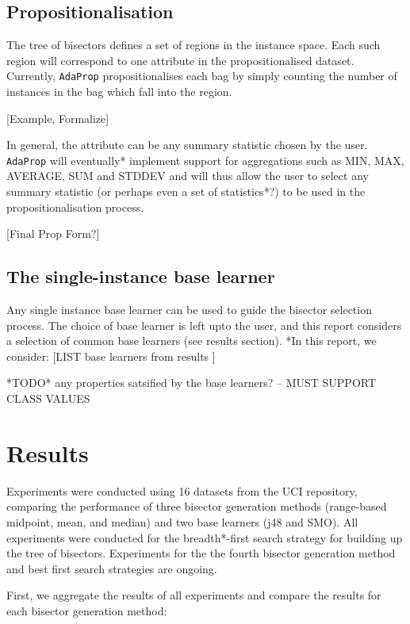 \documentclass[a4paper,12pt]{article} %
\newcommand{\AdaProp}{\texttt{AdaProp}\xspace}
\begin{document}
\subsection{Propositionalisation}
\label{secProp}

The tree of bisectors defines a set of regions in the instance space.
Each such region will correspond to one attribute in the propositionalised dataset.
Currently, \AdaProp propositionalises each bag 
    by simply counting the number of instances in the bag which fall into the region.
    
[Example, Formalize] 

In general, the attribute can be any summary statistic chosen by the user.
\AdaProp will eventually* implement support for aggregations such as 
    MIN, MAX, AVERAGE, SUM and STDDEV and 
    will thus allow the user to select any summary statistic 
    (or perhaps even a set of statistics*?) 
    to be used in the propositionalisation process.
    
[Final Prop Form?]
    

\subsection{The single-instance base learner}    
Any single instance base learner can be used to guide the bisector selection process.
The choice of base learner is left upto the user, and 
    this report considers a selection of common base learners (see results section).
*In this report, we consider: [LIST base learners from results ]    

*TODO* any properties satsified by the base learners?
-- MUST SUPPORT CLASS VALUES




\section{Results}
Experiments were conducted using 16 datasets from the UCI repository, 
    comparing the performance of three bisector generation methods 
    (range-based midpoint, mean, and median)
    and two base learners (j48 and SMO).
All experiments were conducted for the breadth*-first search strategy for 
    building up the tree of bisectors.
Experiments for the the fourth bisector generation method and best first search strategies 
    are ongoing.
    
First, we aggregate the results of all experiments and 
    compare the results for each bisector generation method:
    
\end{document}
